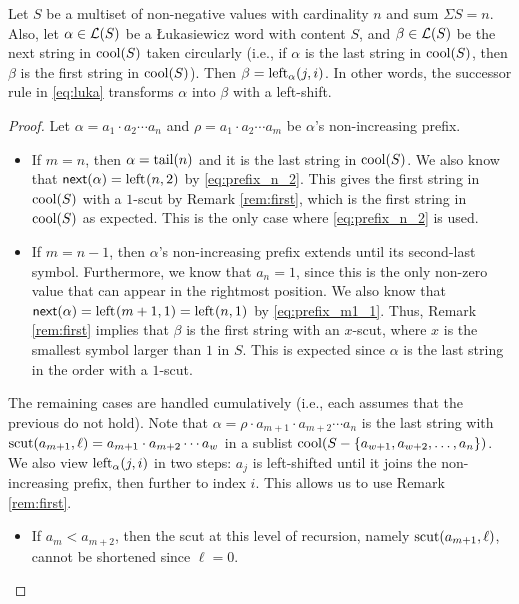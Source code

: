 \begin{theorem}
\label{thm:equal}
Let $S$ be a multiset of non-negative values with cardinality $n$ and sum $\Sigma S = n$.
Also, let $\alpha \in \Lukas{S}$ be a Łukasiewicz word with content $S$, and $\beta \in \Lukas{S}$ be the next string in $\cool{S}$ taken circularly (i.e., if $\alpha$ is the last string in $\cool{S}$, then $\beta$ is the first string in $\cool{S}$).
Then $\beta = \lshiftindex[\alpha]{j}{i}$.
In other words, the successor rule in \eqref{eq:luka} transforms $\alpha$ into $\beta$ with a left-shift.
\end{theorem}
\begin{proof}
Let $\alpha = a_1 \cdot a_2 \cdots a_n$ and $\rho = a_1 \cdot a_2 \cdots a_m$ be $\alpha$'s non-increasing prefix.

\begin{itemize}[nosep]
\item If $m=n$, then $\alpha = \tail(n)$ and it is the last string in $\cool{S}$.
We also know that $\nextPrefix{\alpha} = \lshiftindex{n}{2}$ by \eqref{eq:prefix_n_2}.
This gives the first string in $\cool{S}$ with a $1$-scut by Remark \ref{rem:first}, which is the first string in $\cool{S}$ as expected.
This is the only case where \eqref{eq:prefix_n_2} is used.
\item If $m=n-1$, then $\alpha$'s non-increasing prefix extends until its second-last symbol.
Furthermore, we know that $a_n = 1$, since this is the only non-zero value that can appear in the rightmost position.
We also know that $\nextPrefix{\alpha} = \lshiftindex{m+1}{1} = \lshiftindex{n}{1}$ by \eqref{eq:prefix_m1_1}.
Thus, Remark \ref{rem:first} implies that $\beta$ is the first string with an $x$-scut, where $x$ is the smallest symbol larger than $1$ in $S$.
This is expected since $\alpha$ is the last string in the order with a $1$-scut.
\end{itemize}
\noindent
The remaining cases are handled cumulatively (i.e., each assumes that the previous do not hold).
Note that $\alpha = \rho \cdot a_{m+1} \cdot a_{m+2} \cdots a_n$ is the last string with $\scut(a_{m+1}, \ell) = a_{m+1} \cdot a_{m+2} \cdots a_{w}$ in a sublist $\cool{S- \{a_{w+1}, a_{w+2}, \ldots, a_n\}}$.
We also view $\lshiftindex[\alpha]{j}{i}$ in two steps:
$a_j$ is left-shifted until it joins the non-increasing prefix, then further to index $i$.
This allows us to use Remark \ref{rem:first}. 
\begin{itemize}[nosep]
    \item If $a_m < a_{m+2}$, then the scut at this level of recursion, namely $\scut(a_{m+1}, \ell)$, cannot be shortened since $\ell=0$.

\end{itemize}
\end{proof}
